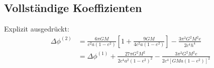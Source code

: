 \subsection{Vollständige Koeffizienten}
Explizit ausgedrückt:
\begin{align*}
\Delta\phi^{(2)} &= \frac{6\pi GM}{c^2 a(1 - e^2)} \left[1 + \frac{9GM}{4c^2 a(1 - e^2)}\right] - \frac{3\pi^2 G^2 M^2 e}{2c^4 h^4} \\
&= \Delta\phi^{(1)} + \frac{27\pi G^2 M^2}{2c^4 a^2 (1 - e^2)^2} - \frac{3\pi^2 G^2 M^2 e}{2c^4 [GMa(1 - e^2)]^2}
\end{align*}
